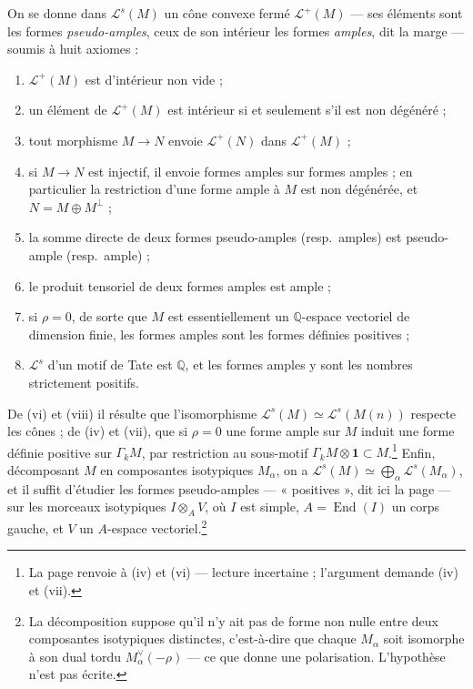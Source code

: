 \documentclass[11pt,a4paper]{article}
\begin{document}
On se donne dans $\mathcal{L}^{s}(M)$ un cône convexe fermé $\mathcal{L}^{+}(M)$ ---
ses éléments sont les formes \emph{pseudo-amples}, ceux de son intérieur les formes
\emph{amples}, dit la marge --- soumis à huit axiomes :
\begin{enumerate}
  \item[(i)] $\mathcal{L}^{+}(M)$ est d'intérieur non vide ;
  \item[(ii)] un élément de $\mathcal{L}^{+}(M)$ est intérieur si et seulement s'il
  est non dégénéré ;
  \item[(iii)] tout morphisme $M \to N$ envoie $\mathcal{L}^{+}(N)$ dans
  $\mathcal{L}^{+}(M)$ ;
  \item[(iv)] si $M \to N$ est injectif, il envoie formes amples sur formes amples ;
  en particulier la restriction d'une forme ample à $M$ est non dégénérée, et
  $N = M \oplus M^{\perp}$ ;
  \item[(v)] la somme directe de deux formes pseudo-amples (resp.\ amples) est
  pseudo-ample (resp.\ ample) ;
  \item[(vi)] le produit tensoriel de deux formes amples est ample ;
  \item[(vii)] si $\rho = 0$, de sorte que $M$ est essentiellement un
  $\mathbb{Q}$-espace vectoriel de dimension finie, les formes amples sont les
  formes définies positives ;
  \item[(viii)] $\mathcal{L}^{s}$ d'un motif de Tate est $\mathbb{Q}$, et les formes
  amples y sont les nombres strictement positifs.
\end{enumerate}
De (vi) et (viii) il résulte que l'isomorphisme $\mathcal{L}^{s}(M) \simeq
\mathcal{L}^{s}(M(n))$ respecte les cônes ; de (iv) et (vii), que si $\rho = 0$ une
forme ample sur $M$ induit une forme définie positive sur $\Gamma_{k}M$, par
restriction au sous-motif $\Gamma_{k}M \otimes \mathbf{1} \subset M$.\footnote{La
page renvoie à (iv) et (vi) --- lecture incertaine ; l'argument demande (iv) et
(vii).} Enfin, décomposant $M$ en composantes isotypiques $M_{\alpha}$, on a
$\mathcal{L}^{s}(M) \simeq \bigoplus_{\alpha}\mathcal{L}^{s}(M_{\alpha})$, et il suffit
d'étudier les formes pseudo-amples --- « positives », dit ici la page --- sur les morceaux isotypiques $I \otimes_{A} V$, où
$I$ est simple, $A = \operatorname{End}(I)$ un corps gauche, et $V$ un $A$-espace
vectoriel.\footnote{La décomposition suppose qu'il n'y ait pas de forme non nulle
entre deux composantes isotypiques distinctes, c'est-à-dire que chaque
$M_{\alpha}$ soit isomorphe à son dual tordu $M_{\alpha}^{\vee}(-\rho)$ --- ce que
donne une polarisation. L'hypothèse n'est pas écrite.}
\end{document}
